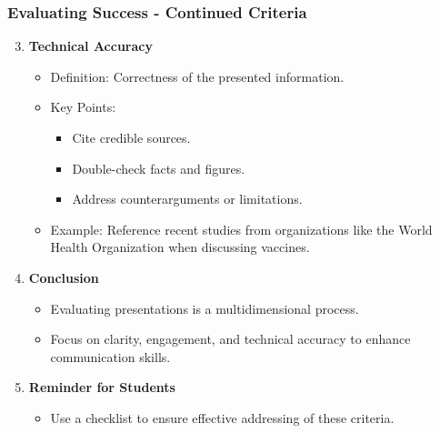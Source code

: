 \documentclass{beamer}
\begin{document}
\begin{frame}[fragile]
    \frametitle{Evaluating Success - Continued Criteria}
    \begin{enumerate}
        \setcounter{enumi}{2} %
        \item \textbf{Technical Accuracy}
        \begin{itemize}
            \item Definition: Correctness of the presented information.
            \item Key Points:
                \begin{itemize}
                    \item Cite credible sources.
                    \item Double-check facts and figures.
                    \item Address counterarguments or limitations.
                \end{itemize}
            \item Example: Reference recent studies from organizations like the World Health Organization when discussing vaccines.
        \end{itemize}
    
        \item \textbf{Conclusion}
        \begin{itemize}
            \item Evaluating presentations is a multidimensional process.
            \item Focus on clarity, engagement, and technical accuracy to enhance communication skills.
        \end{itemize}
        
        \item \textbf{Reminder for Students}
        \begin{itemize}
            \item Use a checklist to ensure effective addressing of these criteria.
        \end{itemize}
    \end{enumerate}
\end{frame}
\end{document}
